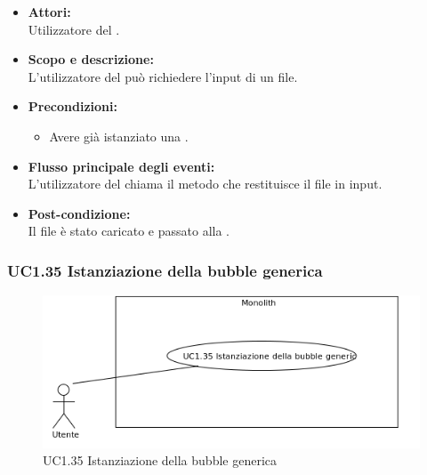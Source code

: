 \begin{itemize}
	\item \textbf{Attori:}
	\\Utilizzatore del .
	\item \textbf{Scopo e descrizione:} 
	\\L'utilizzatore del  può richiedere l'input di un file.
	\item \textbf{Precondizioni:}
	\begin{itemize}
		\item Avere già istanziato una .
	\end{itemize}
	\item \textbf{Flusso principale degli eventi:}
	\\L'utilizzatore del  chiama il metodo che restituisce il file in input.
	\item \textbf{Post-condizione:}
	\\Il file è stato caricato e passato alla .
\end{itemize}

\subsubsection{UC1.35 Istanziazione della bubble generica} \label{UC1.35}

\begin{figure}[H]
	\centering
	\includegraphics[width=15cm]{../../documenti/AnalisiDeiRequisiti/Diagrammi_img/uc1_35.png}
	\caption{UC1.35 Istanziazione della bubble generica}
\end{figure}

